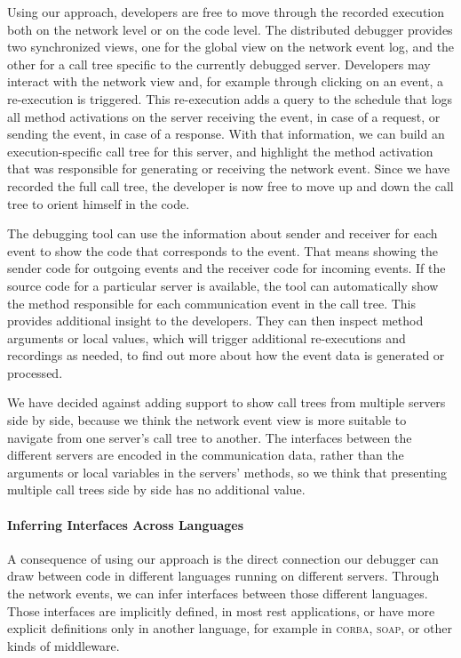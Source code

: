 Using our approach, developers are free to move through the recorded
execution both on the network level or on the code level. The
distributed debugger provides two synchronized views, one for the
global view on the network event log, and the other for a call tree
specific to the currently debugged server. Developers may interact
with the network view and, for example through clicking on an event, a
re-execution is triggered. This re-execution adds a query to the
schedule that logs all method activations on the server receiving the
event, in case of a request, or sending the event, in case of a
response. With that information, we can build an execution-specific
call tree for this server, and highlight the method activation that
was responsible for generating or receiving the network event. Since
we have recorded the full call tree, the developer is now free to move
up and down the call tree to orient himself in the code.

The debugging tool can use the information about sender and receiver
for each event to show the code that corresponds to the event. That
means showing the sender code for outgoing events and the receiver
code for incoming events. If the source code for a particular server
is available, the tool can automatically show the method responsible
for each communication event in the call tree. This provides
additional insight to the developers. They can then inspect method
arguments or local values, which will trigger additional re-executions
and recordings as needed, to find out more about how the event data is
generated or processed.

We have decided against adding support to show call trees from
multiple servers side by side, because we think the network event view
is more suitable to navigate from one server's call tree to
another. The interfaces between the different servers are encoded in
the communication data, rather than the arguments or local variables
in the servers' methods, so we think that presenting multiple call
trees side by side has no additional value.

\paragraph{Inferring Interfaces Across Languages}
\label{sec:inferr-interf-across}

A consequence of using our approach is the direct connection our
debugger can draw between code in different languages running on
different servers. Through the network events, we can infer interfaces
between those different languages. Those interfaces are implicitly
defined, in most \ac{rest} applications, or have more explicit
definitions only in another language, for example in \textsc{corba},
\textsc{soap}, or other kinds of middleware.

